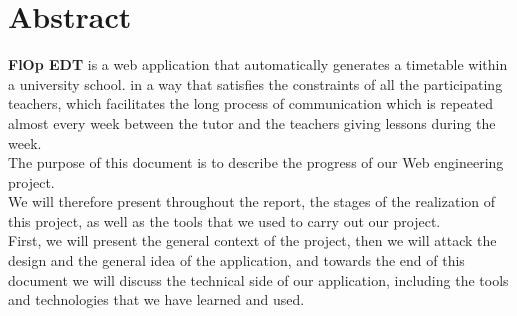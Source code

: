 \chapter*{Abstract}

\textbf{FlOp EDT} is a web application that automatically generates a timetable within a university school. in a way that satisfies the constraints of all the participating teachers, which facilitates the long process of communication which is repeated almost every week between the tutor and the teachers giving lessons during the week. \\

The purpose of this document is to describe the progress of our Web engineering project. \\

We will therefore present throughout the report, the stages of the realization of this project, as well as the tools that we used to carry out our project. \\

First, we will present the general context of the project, then we will attack the design and the general idea of the application, and towards the end of this document we will discuss the technical side of our application, including the tools and technologies that we have learned and used.
\newpage

